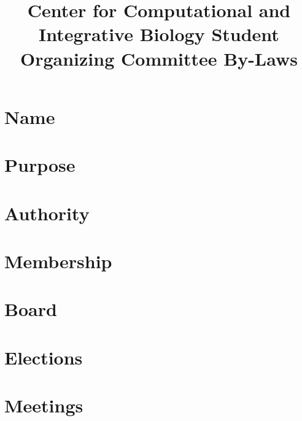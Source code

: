 \documentclass{article} %
\begin{document}
\title{Center for Computational and Integrative Biology Student Organizing Committee By-Laws}
\date{}

\maketitle

\section{Name}



\section{Purpose}



\section{Authority}



\section{Membership}



\section{Board}



\section{Elections}



\section{Meetings}


\end{document}
